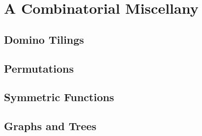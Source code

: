 
\chapter{A Combinatorial Miscellany}


\section{Domino Tilings}


\section{Permutations}


\section{Symmetric Functions}


\section{Graphs and Trees}




\endinput
